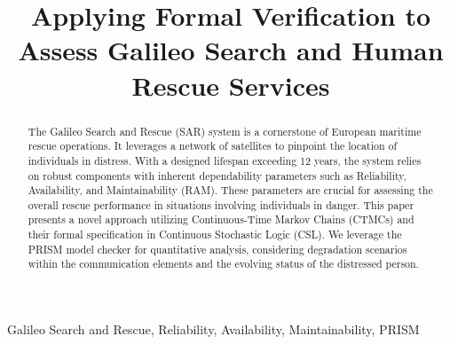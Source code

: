 \documentclass[conference]{IEEEtran}
\begin{document}
\title{Applying Formal Verification to Assess Galileo Search and Human Rescue Services}
\author{
\and
{}
\and
{}
\and
{}
}

\maketitle

\begin{abstract}
The Galileo Search and Rescue (SAR) system is a cornerstone of European maritime rescue operations. It leverages a network of satellites to pinpoint the location of individuals in distress. With a designed lifespan exceeding 12 years, the system relies on robust components with inherent dependability parameters such as Reliability, Availability, and Maintainability (RAM). These parameters are crucial for assessing the overall rescue performance in situations involving individuals in danger. This paper presents a novel approach utilizing Continuous-Time Markov Chains (CTMCs) and their formal specification in Continuous Stochastic Logic (CSL). We leverage the PRISM model checker for quantitative analysis, considering degradation scenarios within the communication elements and the evolving status of the distressed person. 
\end{abstract}

\begin{IEEEkeywords}
Galileo Search and Rescue, Reliability, Availability, Maintainability, PRISM
\end{IEEEkeywords}
\end{document}
